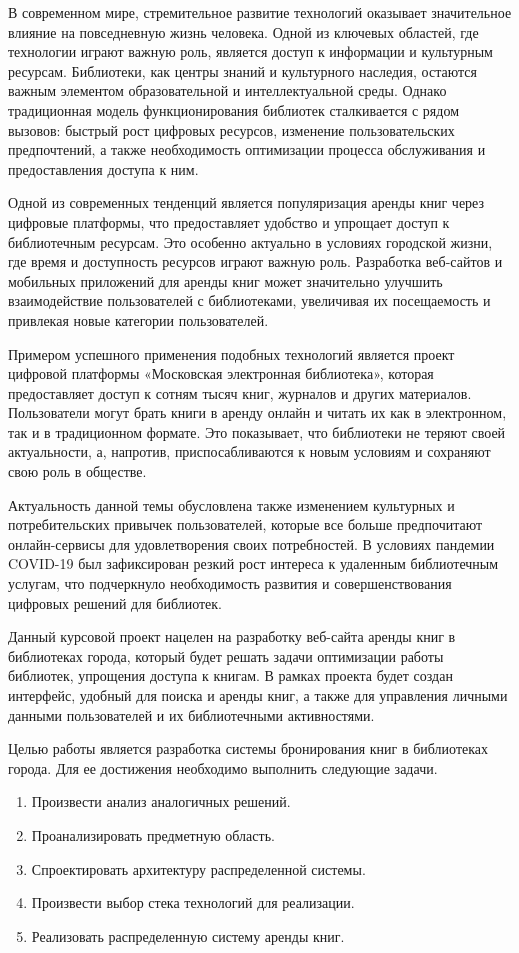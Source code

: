 \maketableofcontents

\intro

В современном мире, стремительное развитие технологий оказывает значительное влияние на повседневную жизнь человека. Одной из ключевых областей, где технологии играют важную роль, является доступ к информации и культурным ресурсам. Библиотеки, как центры знаний и культурного наследия, остаются важным элементом образовательной и интеллектуальной среды. Однако традиционная модель функционирования библиотек сталкивается с рядом вызовов: быстрый рост цифровых ресурсов, изменение пользовательских предпочтений, а также необходимость оптимизации процесса обслуживания и предоставления доступа к ним.

Одной из современных тенденций является популяризация аренды книг через цифровые платформы, что предоставляет удобство и упрощает доступ к библиотечным ресурсам. Это особенно актуально в условиях городской жизни, где время и доступность ресурсов играют важную роль. Разработка веб-сайтов и мобильных приложений для аренды книг может значительно улучшить взаимодействие пользователей с библиотеками, увеличивая их посещаемость и привлекая новые категории пользователей.

Примером успешного применения подобных технологий является проект цифровой платформы «Московская электронная библиотека», которая предоставляет доступ к сотням тысяч книг, журналов и других материалов. Пользователи могут брать книги в аренду онлайн и читать их как в электронном, так и в традиционном формате. Это показывает, что библиотеки не теряют своей актуальности, а, напротив, приспосабливаются к новым условиям и сохраняют свою роль в обществе.

Актуальность данной темы обусловлена также изменением культурных и потребительских привычек пользователей, которые все больше предпочитают онлайн-сервисы для удовлетворения своих потребностей. В условиях пандемии COVID-19 был зафиксирован резкий рост интереса к удаленным библиотечным услугам, что подчеркнуло необходимость развития и совершенствования цифровых решений для библиотек.

Данный курсовой проект нацелен на разработку веб-сайта аренды книг в библиотеках города, который будет решать задачи оптимизации работы библиотек, упрощения доступа к книгам. В рамках проекта будет создан интерфейс, удобный для поиска и аренды книг, а также для управления личными данными пользователей и их библиотечными активностями.

Целью работы является разработка системы бронирования книг в библиотеках города. Для ее достижения необходимо выполнить следующие задачи.

\begin{enumerate}
  \item Произвести анализ аналогичных решений.
  \item Проанализировать предметную область.
  \item Спроектировать архитектуру распределенной системы.
  \item Произвести выбор стека технологий для реализации.
  \item Реализовать распределенную систему аренды книг.
\end{enumerate}
